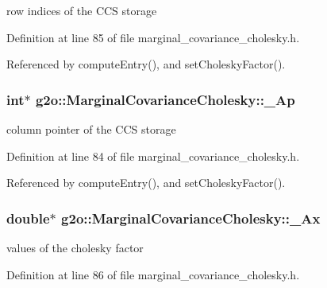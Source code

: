 row indices of the C\+CS storage 



Definition at line 85 of file marginal\+\_\+covariance\+\_\+cholesky.\+h.



Referenced by compute\+Entry(), and set\+Cholesky\+Factor().

\subsubsection[{\texorpdfstring{\+\_\+\+Ap}{_Ap}}]{\setlength{\rightskip}{0pt plus 5cm}int$\ast$ g2o\+::\+Marginal\+Covariance\+Cholesky\+::\+\_\+\+Ap\hspace{0.3cm}{\ttfamily [protected]}}\hypertarget{classg2o_1_1MarginalCovarianceCholesky_a5998463e23c716bb1abb02e9b3e40e0b}{}\label{classg2o_1_1MarginalCovarianceCholesky_a5998463e23c716bb1abb02e9b3e40e0b}


column pointer of the C\+CS storage 



Definition at line 84 of file marginal\+\_\+covariance\+\_\+cholesky.\+h.



Referenced by compute\+Entry(), and set\+Cholesky\+Factor().

\subsubsection[{\texorpdfstring{\+\_\+\+Ax}{_Ax}}]{\setlength{\rightskip}{0pt plus 5cm}double$\ast$ g2o\+::\+Marginal\+Covariance\+Cholesky\+::\+\_\+\+Ax\hspace{0.3cm}{\ttfamily [protected]}}\hypertarget{classg2o_1_1MarginalCovarianceCholesky_a2ac05a8c32b6a2e0cdb0b6a071a7552d}{}\label{classg2o_1_1MarginalCovarianceCholesky_a2ac05a8c32b6a2e0cdb0b6a071a7552d}


values of the cholesky factor 



Definition at line 86 of file marginal\+\_\+covariance\+\_\+cholesky.\+h.



